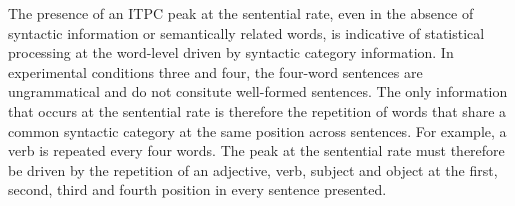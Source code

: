 \documentclass[10pt,letterpaper]{article}
\begin{document}
The presence of an ITPC peak at the sentential rate, even in the
absence of syntactic information or semantically related words, is
indicative of statistical processing at the word-level driven by
syntactic category information. 
%
%
%
%
%
%
%
In experimental conditions three and four, the four-word sentences are
ungrammatical and do not consitute well-formed sentences. The only
information that occurs at the sentential rate is therefore the
repetition of words that share a common syntactic category at the same
position across sentences. For example, a verb is repeated every four
words. The peak at the sentential rate must therefore be driven by the
repetition of an adjective, verb, subject and object at the first,
second, third and fourth position in every sentence presented.
%
%
%
%
%
%
%
%
\end{document}
